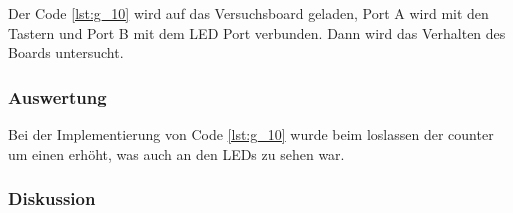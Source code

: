 \documentclass[12pt,a4paper]{article}
\begin{document}
Der Code \ref{lst:g_10} wird auf das Versuchsboard geladen, Port A wird mit den Tastern und Port B mit dem LED Port verbunden. Dann wird das Verhalten des Boards untersucht.

\subsubsection*{Auswertung}

Bei der Implementierung von Code \ref{lst:g_10} wurde beim loslassen der counter um einen erhöht, was auch an den LEDs zu sehen war.

\subsubsection*{Diskussion}
\end{document}
